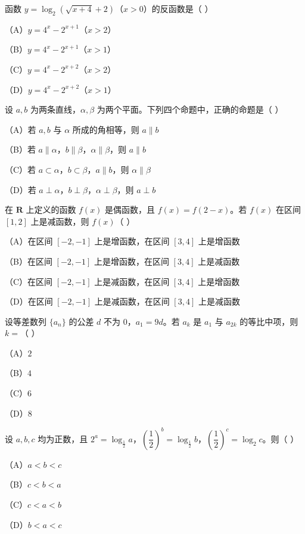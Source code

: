 \begin{question}
函数 $y=\log_2(\sqrt{x+4}+2)$（$x>0$）的反函数是（ ）

（A）$y=4^x-2^{x+1}$（$x>2$）

（B）$y=4^x-2^{x+1}$（$x>1$）

（C）$y=4^x-2^{x+2}$（$x>2$）

（D）$y=4^x-2^{x+2}$（$x>1$）

\end{question}
\begin{question}
设 $a,b$ 为两条直线，$\alpha,\beta$ 为两个平面。下列四个命题中，正确的命题是（ ）

（A）若 $a,b$ 与 $\alpha$ 所成的角相等，则 $a\parallel b$

（B）若 $a\parallel\alpha$，$b\parallel\beta$，$\alpha\parallel\beta$，则 $a\parallel b$

（C）若 $a\subset\alpha$，$b\subset\beta$，$a\parallel b$，则 $\alpha\parallel\beta$

（D）若 $a\perp\alpha$，$b\perp\beta$，$\alpha\perp\beta$，则 $a\perp b$

\end{question}
\begin{question}
在 $\mathbf{R}$ 上定义的函数 $f(x)$ 是偶函数，且 $f(x)=f(2-x)$。若 $f(x)$ 在区间 $[1,2]$ 上是减函数，则 $f(x)$（ ）

（A）在区间 $[-2,-1]$ 上是增函数，在区间 $[3,4]$ 上是增函数

（B）在区间 $[-2,-1]$ 上是增函数，在区间 $[3,4]$ 上是减函数

（C）在区间 $[-2,-1]$ 上是减函数，在区间 $[3,4]$ 上是增函数

（D）在区间 $[-2,-1]$ 上是减函数，在区间 $[3,4]$ 上是减函数

\end{question}
\begin{question}
设等差数列 $\{a_n\}$ 的公差 $d$ 不为 $0$，$a_1=9d$。若 $a_k$ 是 $a_1$ 与 $a_{2k}$ 的等比中项，则 $k=$（ ）

（A）$2$

（B）$4$

（C）$6$

（D）$8$

\end{question}
\begin{question}
设 $a,b,c$ 均为正数，且 $2^a=\log_{\frac12}a$，$\left(\dfrac{1}{2}\right)^b=\log_{\frac12}b$，$\left(\dfrac{1}{2}\right)^c=\log_2 c$。则（ ）

（A）$a<b<c$

（B）$c<b<a$

（C）$c<a<b$

（D）$b<a<c$

\end{question}
